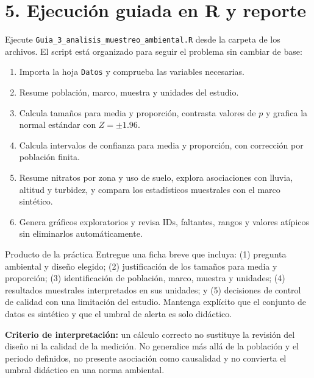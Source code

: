 \documentclass[11pt,a4paper]{article}
\begin{document}
\section*{5. Ejecución guiada en R y reporte}
Ejecute \texttt{Guia\_3\_analisis\_muestreo\_ambiental.R} desde la carpeta de los archivos. El script está organizado para seguir el problema sin cambiar de base:
\begin{enumerate}[label=\textbf{\arabic*.}]
\item Importa la hoja \texttt{Datos} y comprueba las variables necesarias.
\item Resume población, marco, muestra y unidades del estudio.
\item Calcula tamaños para media y proporción, contrasta valores de $p$ y grafica la normal estándar con $Z=\pm1.96$.
\item Calcula intervalos de confianza para media y proporción, con corrección por población finita.
\item Resume nitratos por zona y uso de suelo, explora asociaciones con lluvia, altitud y turbidez, y compara los estadísticos muestrales con el marco sintético.
\item Genera gráficos exploratorios y revisa IDs, faltantes, rangos y valores atípicos sin eliminarlos automáticamente.
\end{enumerate}

\begin{casobox}{Producto de la práctica}
Entregue una ficha breve que incluya: (1) pregunta ambiental y diseño elegido; (2) justificación de los tamaños para media y proporción; (3) identificación de población, marco, muestra y unidades; (4) resultados muestrales interpretados en sus unidades; y (5) decisiones de control de calidad con una limitación del estudio. Mantenga explícito que el conjunto de datos es sintético y que el umbral de alerta es solo didáctico.
\end{casobox}

\begin{alertbox}
\textbf{Criterio de interpretación:} un cálculo correcto no sustituye la revisión del diseño ni la calidad de la medición. No generalice más allá de la población y el periodo definidos, no presente asociación como causalidad y no convierta el umbral didáctico en una norma ambiental.
\end{alertbox}
\end{document}
